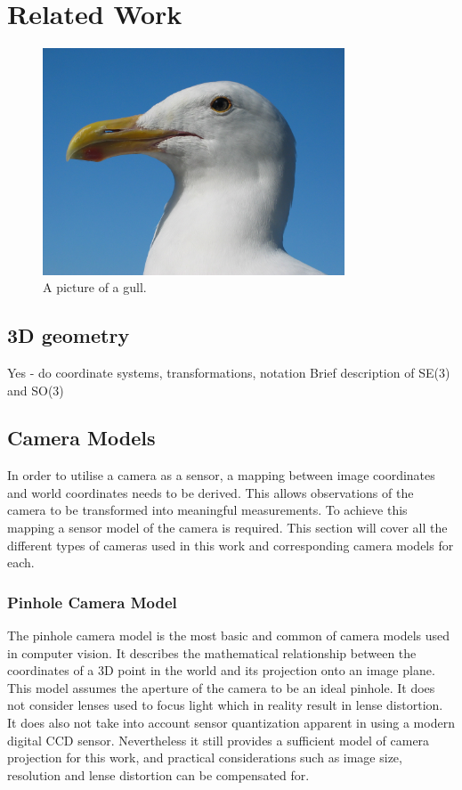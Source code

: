 \chapter{Related Work}
\label{chapter:Related_Work}

\begin{figure}[h!]
  \caption{A picture of a gull.}
  \centering
    \includegraphics[width=0.8\textwidth]{chapters/images/gull}
\end{figure}

\section{3D geometry}

Yes  - do coordinate systems, transformations, notation
Brief description of SE(3) and SO(3)

\section{Camera Models}

In order to utilise a camera as a sensor, a mapping between image coordinates and world
coordinates needs to be derived.  This allows observations of the camera to be transformed into
meaningful measurements.  To achieve this mapping a sensor model of the camera is required. This
section will cover all the different types of cameras used in this work and corresponding camera
models for each. 

\subsection{Pinhole Camera Model}

The pinhole camera model is the most basic and common of camera models used in computer vision.  It
describes the mathematical relationship between the coordinates of a 3D point in the world and its
projection onto an image plane.  This model assumes the aperture of the camera to be an ideal
pinhole. It does not consider lenses used to focus light which in reality result in lense
distortion.  It does also not take into account sensor quantization apparent in using a modern
digital CCD sensor. Nevertheless it still provides a sufficient model of camera projection for this
work, and practical considerations such as image size, resolution and lense distortion can be
compensated for.


